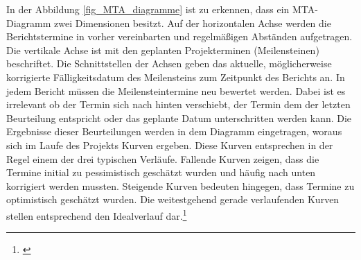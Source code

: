 In der Abbildung \ref{fig_MTA_diagramme} ist zu erkennen, dass ein MTA-Diagramm zwei Dimensionen besitzt. Auf der horizontalen Achse werden die Berichtstermine in vorher vereinbarten und regelmäßigen Abständen aufgetragen. Die vertikale Achse ist mit den geplanten Projekterminen (Meilensteinen) beschriftet. Die Schnittstellen der Achsen geben das aktuelle, möglicherweise korrigierte Fälligkeitsdatum des Meilensteins zum Zeitpunkt des Berichts an. In jedem Bericht müssen die Meilensteintermine neu bewertet werden. Dabei ist es irrelevant ob der Termin sich nach hinten verschiebt, der Termin dem der letzten Beurteilung entspricht oder das geplante Datum unterschritten werden kann. Die Ergebnisse dieser Beurteilungen werden in dem Diagramm eingetragen, woraus sich im Laufe des Projekts Kurven ergeben. Diese Kurven entsprechen in der Regel einem der drei typischen Verläufe. Fallende Kurven zeigen, dass die Termine initial zu pessimistisch geschätzt wurden und häufig nach unten korrigiert werden mussten. Steigende Kurven bedeuten hingegen, dass Termine zu optimistisch geschätzt wurden. Die weitestgehend gerade verlaufenden Kurven stellen entsprechend den Idealverlauf dar.\footnote{\cite{gadatsch_masterkurs_2014}}
